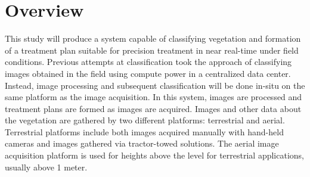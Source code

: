 \documentclass[12pt]{article}
\begin{document}
\section{Overview}
\label{section:proposal}
This study will produce a system capable of classifying vegetation and formation of a treatment plan suitable for precision treatment in near real-time under field conditions.  Previous attempts at classification took the approach of classifying images obtained in the field using compute power in a centralized data center. Instead, image processing and subsequent classification will be done in-situ on the same platform as the image acquisition.  In this system, images are processed and treatment plans are formed as images are acquired. Images and other data about the vegetation are gathered by two different platforms: terrestrial and aerial. Terrestrial platforms include both images acquired manually with hand-held cameras and images gathered via tractor-towed solutions. The aerial image acquisition platform is used for heights above the level for terrestrial applications, usually above 1 meter.
\end{document}
